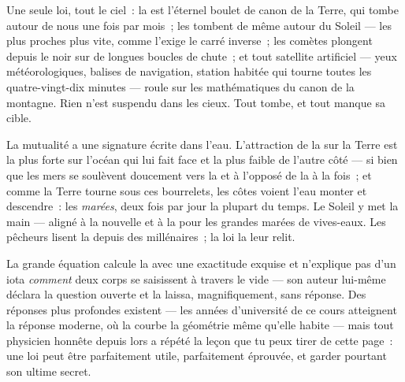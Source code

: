 \begin{proposition}\label{prop:g9:gravitation:runs}
Une seule loi, tout le ciel~: la  est l'éternel boulet de canon de
la Terre, qui tombe autour de nous une fois par mois~; les 
tombent de même autour du Soleil --- les plus proches plus vite, comme
l'exige le carré inverse~; les comètes plongent depuis le noir sur de
longues boucles de chute~; et tout satellite artificiel --- yeux
météorologiques, balises de navigation, station habitée qui tourne
toutes les quatre-vingt-dix minutes --- roule sur les mathématiques du
canon de la montagne. Rien n'est suspendu dans les cieux. Tout tombe,
et tout manque sa cible.
\end{proposition}

\begin{example}\label{ex:g9:gravitation:tides}
La mutualité a une signature écrite dans l'eau. L'attraction de la
 sur la Terre est la plus forte sur l'océan qui lui fait face et
la plus faible de l'autre côté --- si bien que les mers se soulèvent
doucement vers la  et à l'opposé de la  à la fois~; et comme
la Terre tourne sous ces bourrelets, les côtes voient l'eau monter et
descendre~: les \emph{marées}, deux fois par jour la plupart du temps.
Le Soleil y met la main --- aligné à la nouvelle et à la 
pour les grandes marées de vives-eaux. Les pêcheurs lisent la 
depuis des millénaires~; la loi la leur relit.
\end{example}

\begin{remark}\label{rem:g9:gravitation:notsay}
La grande équation calcule la  avec une exactitude exquise et
n'explique pas d'un iota \emph{comment} deux corps se saisissent à
travers le vide --- son auteur lui-même déclara la question ouverte et
la laissa, magnifiquement, sans réponse. Des réponses plus profondes
existent --- les années d'université de ce cours atteignent la
réponse moderne, où la  courbe la géométrie même qu'elle habite
--- mais tout physicien honnête depuis lors a répété la leçon que tu
peux tirer de cette page~: une loi peut être parfaitement utile,
parfaitement éprouvée, et garder pourtant son ultime secret.
\end{remark}

